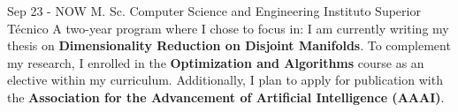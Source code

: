 \begin{rightcolumn}
   \vfill\null


    \cvevent
        {Sep 23 - NOW}
        {M. Sc. Computer Science and Engineering}
        {Instituto Superior Técnico}
        {
        A two-year program where I chose to focus in:
        {}
        I am currently writing my thesis on \textbf{Dimensionality Reduction on Disjoint Manifolds}. To complement my research, I enrolled in the \textbf{Optimization and Algorithms} course as an elective within my curriculum. Additionally, I plan to apply for publication with the \textbf{Association for the Advancement of Artificial Intelligence (AAAI)}.
        }
        {}
        {}
        {}


\end{rightcolumn}
